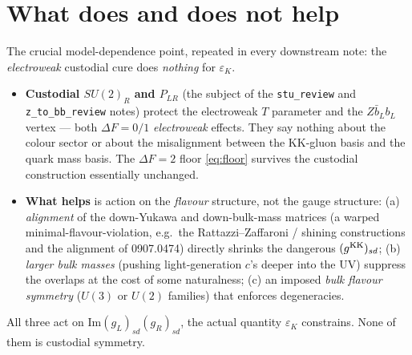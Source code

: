 \documentclass[11pt]{article}
\newcommand{\epsK}{\varepsilon_K}
\newcommand{\code}[1]{\texttt{#1}}
\theoremstyle{definition}
\begin{document}
\section{What does and does not help}
\label{sec:helps}

The crucial model-dependence point, repeated in every downstream note: the
\emph{electroweak} custodial cure does \emph{nothing} for $\epsK$.
\begin{itemize}[leftmargin=1.4em]
\item \textbf{Custodial $SU(2)_R$ and $P_{LR}$} (the subject of the
\code{stu\_review} and \code{z\_to\_bb\_review} notes) protect the electroweak $T$
parameter and the $Z\bar b_L b_L$ vertex --- both $\Delta F=0/1$ \emph{electroweak}
effects. They say nothing about the colour sector or about the misalignment between
the KK-gluon basis and the quark mass basis. The $\Delta F=2$ floor
\eqref{eq:floor} survives the custodial construction essentially unchanged.
\item \textbf{What helps} is action on the \emph{flavour} structure, not the gauge
structure: (a) \emph{alignment} of the down-Yukawa and down-bulk-mass matrices (a
warped minimal-flavour-violation, e.g.\ the Rattazzi--Zaffaroni / shining
constructions and the alignment of 0907.0474) directly shrinks the dangerous
$(g^{\rm KK})_{sd}$; (b) \emph{larger bulk masses} (pushing light-generation $c$'s
deeper into the UV) suppress the overlaps at the cost of some naturalness; (c) an
imposed \emph{bulk flavour symmetry} ($U(3)$ or $U(2)$ families) that enforces
degeneracies.
\end{itemize}
All three act on $\mathrm{Im}(g_L)_{sd}(g_R)_{sd}$, the actual quantity $\epsK$
constrains. None of them is custodial symmetry.
\end{document}
